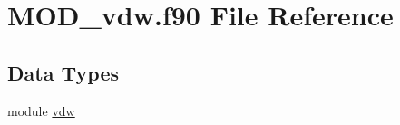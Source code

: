 \hypertarget{MOD__vdw_8f90}{\section{M\-O\-D\-\_\-vdw.\-f90 File Reference}
\label{MOD__vdw_8f90}
}
\subsection*{Data Types}
\begin{DoxyCompactItemize}
\item 
module \hyperlink{classvdw}{vdw}
\end{DoxyCompactItemize}
